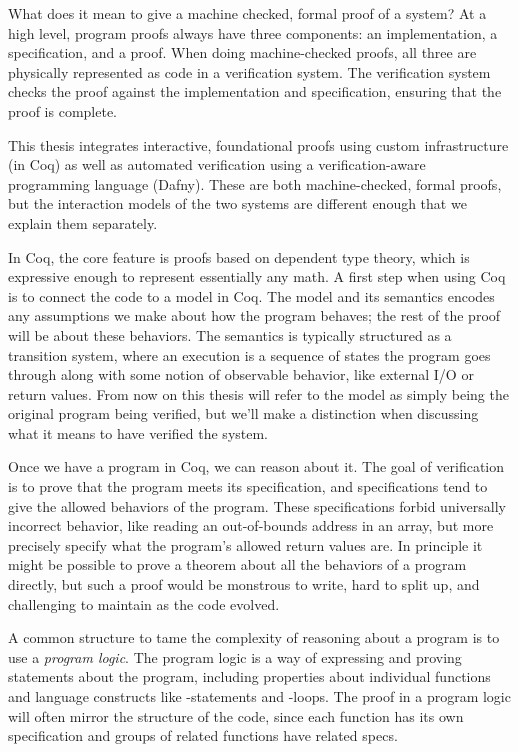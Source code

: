 What does it mean to give a machine checked, formal proof of a system? At a high
level, program proofs always have three components: an implementation, a
specification, and a proof. When doing machine-checked proofs, all three are
physically represented as code in a verification system. The verification system
checks the proof against the implementation and specification, ensuring that the
proof is complete.


This thesis integrates interactive, foundational proofs using custom
infrastructure (in Coq) as well as automated verification using a
verification-aware programming language (Dafny). These are both machine-checked,
formal proofs, but the interaction models of the two systems are different
enough that we explain them separately.

In Coq, the core feature is proofs based on dependent type theory, which is
expressive enough to represent essentially any math. A first step when using Coq
is to connect the code to a model in Coq. The model and its semantics encodes any
assumptions we make about how the program behaves; the rest of the proof will be
about these behaviors. The semantics is typically structured as a transition
system, where an execution is a sequence of states the program goes through
along with some notion of observable behavior, like external I/O or return
values. From now on this thesis will refer to the model as simply being the original
program being verified,
but we'll make a distinction when discussing what it means to have verified
the system.

Once we have a program in Coq, we can reason about it. The goal of
verification is to prove that the program meets its specification, and
specifications tend to give the allowed behaviors of the program. These
specifications forbid universally incorrect behavior, like reading an
out-of-bounds address in an array, but more precisely specify what the program's
allowed return values are. In principle it might be possible to prove a theorem
about all the behaviors of a program directly, but such a proof would be
monstrous to write, hard to split up, and challenging to maintain as the code
evolved.

A common structure to tame the complexity of reasoning about a program is to use
a \emph{program logic}. The program logic is a way of expressing and proving
statements about the program, including properties about individual functions
and language constructs like -statements and -loops. The proof
in a program logic will often mirror the structure of the code, since each
function has its own specification and groups of related functions have related
specs.

